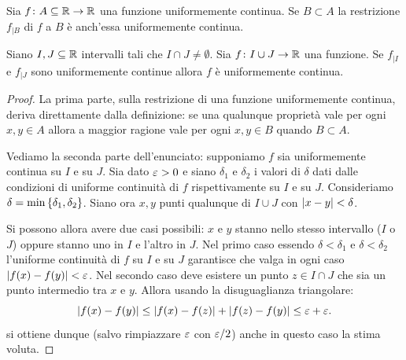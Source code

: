 \begin{theorem}
Sia $f\colon A \subseteq \mathbb R \to \mathbb R$ una funzione uniformemente continua. Se $B\subset A$ la restrizione $f_{|B}$ di $f$ a $B$ è anch'essa uniformemente continua.

Siano $I,J\subseteq \mathbb R$ intervalli tali che $I\cap J \neq \emptyset$.
Sia $f\colon I \cup J \to \mathbb R$ una funzione. Se $f_{|I}$ e $f_{|J}$ sono uniformemente continue allora $f$ è uniformemente continua.
\end{theorem}
\begin{proof}
La prima parte, sulla restrizione di una funzione uniformemente continua, deriva direttamente dalla definizione:
se una qualunque proprietà vale per ogni $x,y\in A$ allora a maggior ragione vale per ogni $x,y\in B$ quando $B\subset A$.

Vediamo la seconda parte dell'enunciato: supponiamo $f$ sia uniformemente continua su $I$ e su $J$.
Sia dato $\varepsilon>0$ e siano $\delta_1$ e $\delta_2$ i valori di $\delta$ dati dalle condizioni di uniforme continuità di $f$ rispettivamente su $I$ e su $J$. Consideriamo $\delta = \min{\left\{ \delta_1, \delta_2 \right\}}$.
Siano ora $x,y$ punti qualunque di $I\cup J$ con ${\left|x-y\right|}< \delta$.

Si possono allora avere due casi possibili:
$x$ e $y$ stanno nello stesso intervallo ($I$ o $J$) oppure stanno uno in $I$ e l'altro in $J$.
Nel primo caso essendo $\delta < \delta_1$ e $\delta< \delta_2$ l'uniforme continuità di $f$ su $I$ e su $J$ garantisce che valga in ogni caso ${\left|f(x)-f(y)\right|} < \varepsilon$. Nel secondo caso deve esistere un punto $z \in I\cap J$ che sia un punto intermedio tra $x$ e $y$.
Allora usando la disuguaglianza triangolare:
\[
  {\left|f(x) - f(y)\right|} \le {\left|f(x) - f(z)\right|} + {\left|f(z) - f(y)\right|}
     \le \varepsilon + \varepsilon.
\]
si ottiene dunque (salvo rimpiazzare $\varepsilon$ con $\varepsilon/2$) anche in
questo caso la stima voluta.
\end{proof}


